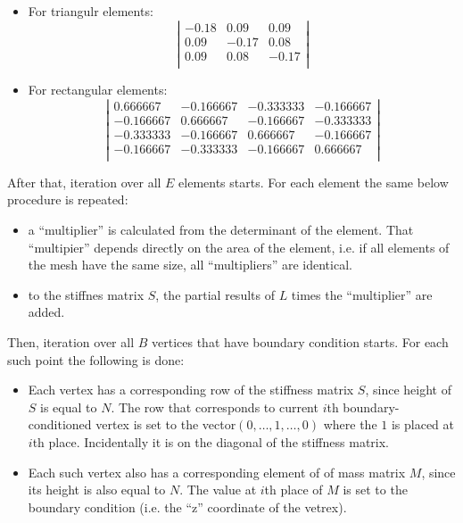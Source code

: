\documentclass[a4paper,12pt]{article}
\begin{document}
\begin{itemize}

  \item For triangulr elements:
  \[
  \left| \begin{array}{rrr}
  -0.18 &  0.09 &  0.09 \\
   0.09 & -0.17 &  0.08 \\
   0.09 &  0.08 & -0.17 \\
  \end{array} \right|
  \]

  \item For rectangular elements:
  \[
  \left| \begin{array}{rrrr}
   0.666667 & -0.166667 & -0.333333 & -0.166667 \\
  -0.166667 &  0.666667 & -0.166667 & -0.333333 \\
  -0.333333 & -0.166667 &  0.666667 & -0.166667 \\
  -0.166667 & -0.333333 & -0.166667 &  0.666667 \\
  \end{array} \right|
  \]

\end{itemize}

After that, iteration over all $E$ elements starts. For each element the same below procedure is repeated:

\begin{itemize}

  \item a ``multiplier'' is calculated from the determinant of the element. That ``multipier'' depends directly on the
  area of the element, i.e. if all elements of the mesh have the same size, all ``multipliers'' are identical.

  \item to the stiffnes matrix $S$, the partial results of $L$ times the ``multiplier'' are added.

\end{itemize}

Then, iteration over all $B$ vertices that have boundary condition starts. For each such point the following is done:

\begin{itemize}

  \item Each vertex has a corresponding row of the stiffness matrix $S$, since height of $S$ is equal to $N$. The row
  that corresponds to current $i$th boundary-conditioned vertex is set to the vector$(0,\ldots,1,\ldots,0)$ where the
  $1$ is placed at $i$th place. Incidentally it is on the diagonal of the stiffness matrix.
  
  \item Each such vertex also has a corresponding element of of mass matrix $M$, since its height is also equal to $N$.
  The value at $i$th place of $M$ is set to the boundary condition (i.e. the ``z'' coordinate of the vetrex).

\end{itemize}
\end{document}
